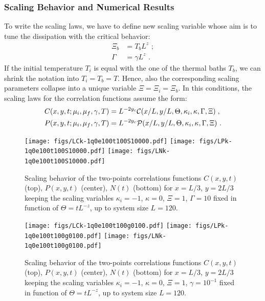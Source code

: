 \documentclass[pra,twocolumn,preprintnumbers,amsmath,amssymb,nofootinbib,floatfix,longbibliography]{revtex4}
\begin{document}
\subsubsection{Scaling Behavior and Numerical Results}

To write the scaling laws, we have to define new scaling
variable whose aim is to tune the dissipation with the
critical behavior:
\begin{align}
	\label{TbScalvar}
	\Xi_b & = T_b L^{z} \,\,;\\
	\Gamma & = \gamma L^{z} \,\,.
\end{align}
If the initial temperature $T_i$ is equal with the one of
the thermal baths $T_b$, we can shrink the notation into
$T_i=T_b=T$. Hence, also the corresponding scaling
parameters collapse into a unique variable
$\Xi = \Xi_i = \Xi_b$. In this conditions, the scaling laws
for the correlation functions assume the form:
\begin{align}
  \label{scalTdiss+quench}
  C(x,y,t;\mu_i,\mu_f,\gamma, T) & = L^{-2y_c}
  {\cal C}(x/L,y/L,\Theta,\kappa_i,\kappa,\Gamma,\Xi)\;,\\
  P(x,y,t;\mu_i,\mu_f,\gamma, T) & = L^{-2y_c}
  {\cal P}(x/L, y/L,\Theta,\kappa_i,\kappa,\Gamma,\Xi)\,\,.
\end{align}

\begin{figure}[!htb]
  \texttt{[image: figs/LCk-1q0e100t100S10000.pdf]}
  \texttt{[image: figs/LPk-1q0e100t100S10000.pdf]}
  \texttt{[image: figs/LNk-1q0e100t100S10000.pdf]}
  \caption{Scaling behavior of the two-points
    correlations functions $C(x,y,t)$ (top), $P(x,y,t)$
    (center), $N(t)$ (bottom) for $x=L/3$, $y=2L/3$
    keeping the scaling variables $\kappa_i=-1$,
    $\kappa=0$, $\Xi = 1$, $\Gamma = 10$ fixed in function
    of $\Theta = tL^{-z}$, up to system size $L=120$.}
  \label{k-1q0e100t100S10000}
\end{figure}



\begin{figure}[!htb]
  \texttt{[image: figs/LCk-1q0e100t100g0100.pdf]}
  \texttt{[image: figs/LPk-1q0e100t100g0100.pdf]}
  \texttt{[image: figs/LNk-1q0e100t100g0100.pdf]}
  \caption{Scaling behavior of the two-points
    correlations functions $C(x,y,t)$ (top), $P(x,y,t)$
    (center), $N(t)$ (bottom) for $x=L/3$, $y=2L/3$
    keeping the scaling
    variables $\kappa_i=-1$, $\kappa=0$, $\Xi=1$,
     $\gamma=10^{-1}$ fixed in function of
    $\Theta = tL^{-z}$, up to system size $L=120$.}
  \label{k-1q0e100t100g0100}
\end{figure}
\end{document}
